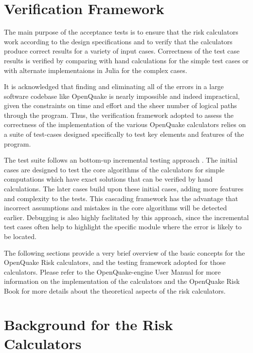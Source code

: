 \section{Verification Framework}
The main purpose of the acceptance tests is to ensure that the risk calculators work according to the design specifications and to verify that the calculators produce correct results for a variety of input cases. Correctness of the test case results is verified by comparing with hand calculations for the simple test cases or with alternate implementaions in Julia for the complex cases.

It is acknowledged that finding and eliminating all of the errors in a large software codebase like OpenQuake is nearly impossible and indeed impractical, given the constraints on time and effort and the sheer number of logical paths through the program. Thus, the verification framework adopted to assess the correctness of the implementation of the various OpenQuake calculators relies on a suite of test-cases designed specifically to test key elements and features of the program.

The test suite follows an bottom-up incremental testing approach \citep{myers2012}. The initial cases are designed to test the core algorithms of the calculators for simple computations which have exact solutions that can be verified by hand calculations. The later cases build upon these initial cases, adding more features and complexity to the tests. This cascading framework has the advantage that incorrect assumptions and mistakes in the core algorithms will be detected earlier. Debugging is also highly faclitated by this approach, since the incremental test cases often help to highlight the specific module where the error is likely to be located.

The following sections provide a very brief overview of the basic concepts for the OpenQuake Risk calculators, and the testing framework adopted for those calculators. Please refer to the OpenQuake-engine User Manual for more information on the implementation of the calculators and the OpenQuake Risk Book for more details about the theoretical aspects of the risk calculators.

\section{Background for the Risk Calculators}
%    
